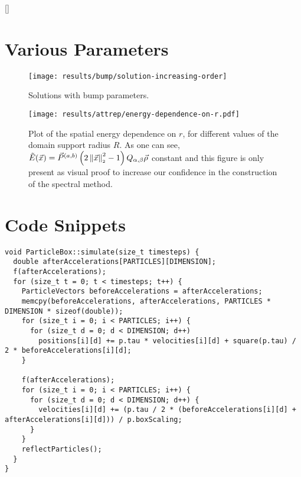 \appendix
{}[\vspace{4.5cm}]
\titlespacing{\chapter}{0cm}{0cm}{0cm}

\chapter{Various Parameters}
\label{chap:appendix}

\begin{figure}[H]
  \centering
  \texttt{[image: results/bump/solution-increasing-order]}
  \caption[Bump parameter solutions]{Solutions with bump parameters.}
  \label{fig:bump-solutions}
\end{figure}

\begin{figure}[H]
  \centering
  \texttt{[image: results/attrep/energy-dependence-on-r.pdf]}
  \caption[Spatial energy dependence on $r$]{Plot of the spatial energy dependence on $r$, for different values of the domain support radius $R$. As one can see, $\tilde{E}(\vec{x}) = \vec{P}^{(a, b)}\left(2 \left\lVert\vec{x}\right\rVert_{\scriptscriptstyle 2}^2 - 1\right) Q_{\alpha,\beta} \vec{\rho}$ constant and this figure is only present as visual proof to increase our confidence in the construction of the spectral method.}
  \label{fig:spatial-energy-dependence}
\end{figure}


\chapter{Code Snippets}
\label{appendix:code-snippets}
\begin{verbatim}
void ParticleBox::simulate(size_t timesteps) {
  double afterAccelerations[PARTICLES][DIMENSION];
  f(afterAccelerations);
  for (size_t t = 0; t < timesteps; t++) {
    ParticleVectors beforeAccelerations = afterAccelerations;
    memcpy(beforeAccelerations, afterAccelerations, PARTICLES * DIMENSION * sizeof(double));
    for (size_t i = 0; i < PARTICLES; i++) {
      for (size_t d = 0; d < DIMENSION; d++)
        positions[i][d] += p.tau * velocities[i][d] + square(p.tau) / 2 * beforeAccelerations[i][d];
    }

    f(afterAccelerations);
    for (size_t i = 0; i < PARTICLES; i++) {
      for (size_t d = 0; d < DIMENSION; d++) {
        velocities[i][d] += (p.tau / 2 * (beforeAccelerations[i][d] + afterAccelerations[i][d])) / p.boxScaling;
      }
    }
    reflectParticles();
  }
}
\end{verbatim}
